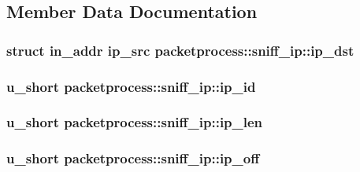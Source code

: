 \subsection{Member Data Documentation}
\hypertarget{structpacketprocess_1_1sniff__ip_ac400f30b4020540644d08fedaa2349f2}{
\subsubsection[{ip\-\_\-dst}]{\setlength{\rightskip}{0pt plus 5cm}struct in\-\_\-addr ip\-\_\-src packetprocess\-::sniff\-\_\-ip\-::ip\-\_\-dst}}\label{structpacketprocess_1_1sniff__ip_ac400f30b4020540644d08fedaa2349f2}
\hypertarget{structpacketprocess_1_1sniff__ip_aa756a51f634dc93175521ea1d58ed36c}{
\subsubsection[{ip\-\_\-id}]{\setlength{\rightskip}{0pt plus 5cm}u\-\_\-short packetprocess\-::sniff\-\_\-ip\-::ip\-\_\-id}}\label{structpacketprocess_1_1sniff__ip_aa756a51f634dc93175521ea1d58ed36c}
\hypertarget{structpacketprocess_1_1sniff__ip_a98befd872cec3609b97989647cf5f9fd}{
\subsubsection[{ip\-\_\-len}]{\setlength{\rightskip}{0pt plus 5cm}u\-\_\-short packetprocess\-::sniff\-\_\-ip\-::ip\-\_\-len}}\label{structpacketprocess_1_1sniff__ip_a98befd872cec3609b97989647cf5f9fd}
\hypertarget{structpacketprocess_1_1sniff__ip_a63728e3756b9d6736049dbed1b189275}{
\subsubsection[{ip\-\_\-off}]{\setlength{\rightskip}{0pt plus 5cm}u\-\_\-short packetprocess\-::sniff\-\_\-ip\-::ip\-\_\-off}}\label{structpacketprocess_1_1sniff__ip_a63728e3756b9d6736049dbed1b189275}
